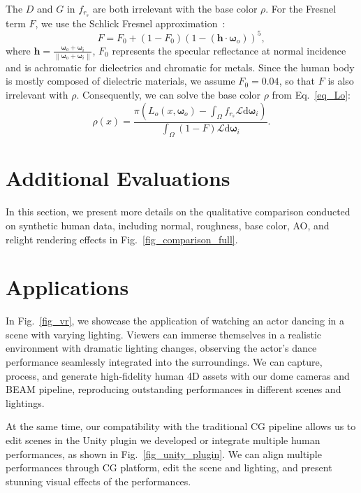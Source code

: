 The $D$ and $G$ in $f_{r_s}$ are both irrelevant with the base color $\rho$. For the Fresnel term $F$, we use the Schlick Fresnel approximation~\cite{Schlick1994AnIB}:
\begin{equation}
     F =  F_0 + (1 - F_0) \left(1- \left(\mathbf{h} \cdot \boldsymbol{\omega}_o\right)\right)^5,
 \end{equation}
where $\mathbf{h}=\frac{\boldsymbol{\omega}_o+\boldsymbol{\omega}_i}{\left \| \boldsymbol{\omega}_o+\boldsymbol{\omega}_i \right \|}$, $F_0$ represents the specular reflectance at normal incidence and is achromatic for dielectrics and chromatic for metals. Since the human body is mostly composed of dielectric materials, we assume $F_0=0.04$, so that $F$ is also irrelevant with $\rho$. 
Consequently, we can solve the base color $\rho$ from Eq.~\ref{eq_Lo}:
\begin{equation}
     \rho(x) = \frac{\pi \left(L_o(x, \boldsymbol{\omega}_{o}) - \int_\Omega f_{r_s}  \mathcal{L} \mathrm{d} \boldsymbol{\omega}_{i}\right)}{  \int_\Omega 
    \left(1-F\right)  \mathcal{L} \mathrm{d} \boldsymbol{\omega}_{i}}.
\end{equation}


\section{Additional Evaluations}
In this section, we present more details on the qualitative comparison conducted on synthetic human data, including normal, roughness, base color, AO, and relight rendering effects in Fig.~\ref{fig_comparison_full}.

\section{Applications}
In Fig.~\ref{fig_vr}, we showcase the application of watching an actor dancing in a scene with varying lighting. Viewers can immerse themselves in a realistic environment with dramatic lighting changes, observing the actor's dance performance seamlessly integrated into the surroundings. We can capture, process, and generate high-fidelity human 4D assets with our dome cameras and BEAM pipeline, reproducing outstanding performances in different scenes and lightings.

At the same time, our compatibility with the traditional CG pipeline allows us to edit scenes in the Unity plugin we developed or integrate multiple human performances, as shown in Fig.~\ref{fig_unity_plugin}. We can align multiple performances through CG platform, edit the scene and lighting, and present stunning visual effects of the performances.




